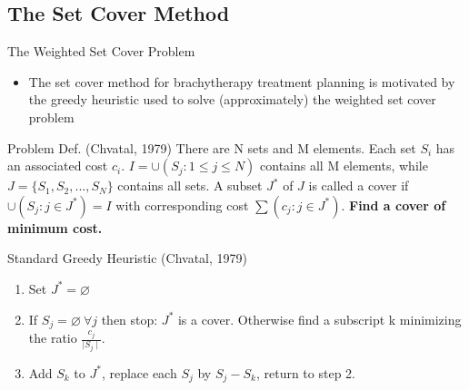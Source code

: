 \documentclass{beamer}
\begin{document}
\subsection{The Set Cover Method}
\begin{frame}{The Weighted Set Cover Problem}

  \begin{itemize}
    \item The set cover method for brachytherapy treatment planning is
      motivated by the greedy heuristic used to solve (approximately) the 
      weighted set cover problem
  \end{itemize}
  
  \medskip

  \begin{beamerboxesrounded}[upper=boxheadcolor,lower=boxbodycolor,shadow=true]
    {Problem Def. (Chvatal, 1979)}
    There are N sets and M elements. Each set $S_i$ has an associated cost 
    $c_i$. $I = \cup\left(S_j : 1 \leq j \leq N \right)$ contains all M 
    elements, while $J = \{S_1,S_2,...,S_N\}$ contains all sets. A subset $J^*$
    of $J$ is called a cover if $\cup\left(S_j : j \in J^* \right) = I$ with 
    corresponding cost $\sum\left(c_j : j \in J^*\right)$. 
    \textbf{Find a cover of minimum cost.}
  \end{beamerboxesrounded}
  
  \medskip

  \begin{beamerboxesrounded}[upper=boxheadcolor,lower=boxbodycolor,shadow=true]
    {Standard Greedy Heuristic (Chvatal, 1979)}
    \begin{enumerate}
      \item Set $J^* = \varnothing$
      \item If $S_j = \varnothing \ \forall j$ then stop: $J^*$ is a cover. 
        Otherwise find a subscript k minimizing the ratio 
        $\frac{c_j}{\mid S_j \mid}$.
      \item Add $S_k$ to $J^*$, replace each $S_j$ by $S_j - S_k$, return to step 
        2.
    \end{enumerate}
  \end{beamerboxesrounded}

\end{frame}
\end{document}
